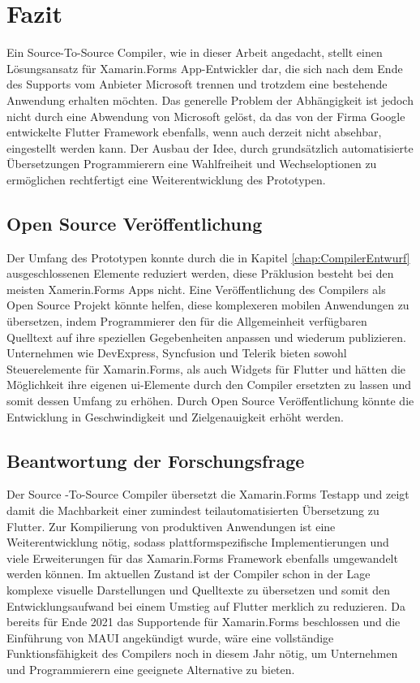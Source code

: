\chapter{Fazit}
\label{chap:FazitAusblick}
Ein Source-To-Source Compiler,  wie in dieser Arbeit angedacht, stellt einen Lösungsansatz für Xamarin.Forms App-Entwickler dar,  die sich nach dem Ende des Supports vom Anbieter Microsoft trennen und trotzdem eine bestehende Anwendung erhalten möchten.  Das generelle Problem der Abhängigkeit ist jedoch nicht durch eine Abwendung von Microsoft gelöst, da das von der Firma Google entwickelte Flutter Framework ebenfalls, wenn auch derzeit nicht absehbar,  eingestellt werden kann. Der Ausbau der Idee,  durch grundsätzlich automatisierte Übersetzungen Programmierern eine Wahlfreiheit und Wechseloptionen zu ermöglichen rechtfertigt eine Weiterentwicklung des Prototypen.

\section{Open Source Veröffentlichung}

Der Umfang des Prototypen konnte durch die in Kapitel \ref{chap:CompilerEntwurf}  ausgeschlossenen Elemente 
reduziert werden, diese Präklusion besteht bei den meisten Xamerin.Forms Apps nicht. 
Eine Veröffentlichung des Compilers als Open Source Projekt könnte helfen, diese komplexeren 
mobilen Anwendungen zu übersetzen,  indem Programmierer den für die Allgemeinheit verfügbaren 
Quelltext auf ihre speziellen Gegebenheiten anpassen und wiederum publizieren.
Unternehmen wie DevExpress,  Syncfusion und Telerik bieten sowohl Steuerelemente für 
Xamarin.Forms, als auch Widgets für Flutter und hätten die Möglichkeit ihre eigenen \ac{ui}-Elemente 
durch den Compiler ersetzten zu lassen und somit dessen Umfang zu erhöhen.  
Durch Open Source Veröffentlichung könnte die Entwicklung in Geschwindigkeit und Zielgenauigkeit 
erhöht werden.

\section{Beantwortung der Forschungsfrage}
Der Source -To-Source Compiler übersetzt die Xamarin.Forms Testapp und zeigt damit die 
Machbarkeit einer zumindest teilautomatisierten Übersetzung zu Flutter.
Zur Kompilierung von produktiven Anwendungen ist eine Weiterentwicklung nötig, sodass 
plattformspezifische Implementierungen und viele Erweiterungen für das Xamarin.Forms Framework 
ebenfalls umgewandelt werden können.
Im aktuellen Zustand ist der Compiler schon in der Lage komplexe visuelle Darstellungen
und Quelltexte zu übersetzen und somit den Entwicklungsaufwand bei einem Umstieg auf Flutter 
merklich zu reduzieren.
Da bereits für Ende 2021 das Supportende für Xamarin.Forms beschlossen und die Einführung von 
MAUI angekündigt wurde, wäre eine vollständige Funktionsfähigkeit des Compilers noch in diesem 
Jahr nötig, um Unternehmen und Programmierern eine geeignete Alternative zu bieten. 

